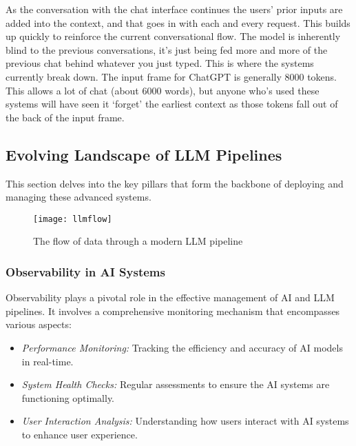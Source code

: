 As the conversation with the chat interface continues the users' prior inputs are added into the context, and that goes in with each and every request. This builds up quickly to reinforce the current conversational flow. The model is inherently blind to the previous conversations, it's just being fed more and more of the previous chat behind whatever you just typed. This is where the systems currently break down. The input frame for ChatGPT is generally 8000 tokens. This allows a lot of chat (about 6000 words), but anyone who's used these systems will have seen it `forget' the earliest context as those tokens fall out of the back of the input frame.\par 
\subsection{Evolving Landscape of LLM Pipelines}

This section delves into the key pillars that form the backbone of deploying and managing these advanced systems.

\begin{comment}
flowchart TB
    A[Start: User Request] -->|Determine Jurisdiction| B[Jurisdiction Check]
    B -->|Data Input| C[Observability]
    C --> D[AI Gateway]
    D -->|Model Selection| E[Model Interaction]
    E --> F[Security and Compliance Check]
    F --> G[End: Deliver Response]

\end{comment}

\begin{figure}[H]
    \centering
    \texttt{[image: llmflow]}
    \caption{The flow of data through a modern LLM pipeline}
    \label{fig:llmflow}
\end{figure}



\subsubsection{Observability in AI Systems}
Observability plays a pivotal role in the effective management of AI and LLM pipelines. It involves a comprehensive monitoring mechanism that encompasses various aspects:
\begin{itemize}
    \item \textit{Performance Monitoring:} Tracking the efficiency and accuracy of AI models in real-time.
    \item \textit{System Health Checks:} Regular assessments to ensure the AI systems are functioning optimally.
    \item \textit{User Interaction Analysis:} Understanding how users interact with AI systems to enhance user experience.
\end{itemize}

